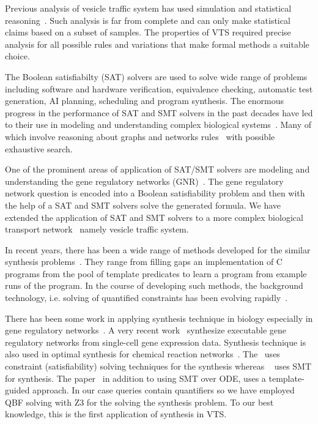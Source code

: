 Previous analysis of vesicle traffic system has used simulation and statistical reasoning~\cite{mani2016stacking}. 
%
Such analysis is far from complete and can only make statistical claims based on a subset of samples. 
%
The properties of VTS required precise analysis for all possible rules and variations that make formal methods a suitable choice.

The Boolean satisfiabilty (SAT) solvers are used to solve wide range of problems including
%
software and hardware verification, equivalence checking, automatic test generation,
AI planning, scheduling and program synthesis. 
%
The enormous progress in the performance of SAT and SMT solvers
in the past decades have led to their use in modeling and understanding complex biological systems~\cite{heule2010exact,yordanov2013smt,mangla2010timing}. 
%
Many of which involve reasoning about graphs and networks rules~\cite{guerra2012reasoning,chin2008biographe} with possible exhaustive search.
%

One of the prominent areas of application of SAT/SMT solvers are modeling and understanding the gene regulatory networks (GNR)~\cite{giacobbe2015model,rosenblueth2014inference, batt2010efficient, yordanov2016method, dunn2014defining, paoletti2014analyzing, koksal2013synthesis}.
%
The gene regulatory network question is encoded into a Boolean satisfiability problem and then with the help of a SAT and SMT solvers solve the generated formula. 
% 
We have extended the application of SAT and SMT solvers to a more complex biological transport network~\cite{mani2016stacking} namely vesicle traffic system. 

In recent years, there has been a wide range of methods
developed for the similar synthesis problems~\cite{sketch,sygus,exampleSynth}.
%
They range from filling gaps an implementation of C programs from the pool of template predicates to learn a program from example
runs of the program.
%
In the course of developing such methods,
the background technology, i.e. solving of quantified
constraints has been evolving rapidly~\cite{lonsing2010depqbf,z3Quant}.
%

There has been some work in
applying synthesis technique in biology especially in gene regulatory networks~\cite{shavit2016automated, fisher2015synthesising}. A very recent work~\cite{fisher2015synthesising} synthesize executable gene regulatory networks from single-cell gene expression data.
Synthesis technique is also used in optimal synthesis for chemical reaction networks~\cite{cardelli2017syntax}. The~\cite{fisher2015synthesising} uses constraint (satisfiability) solving techniques for the synthesis whereas ~\cite{shavit2016automated} uses SMT for synthesis. The paper~\cite{cardelli2017syntax} in addition to using SMT over ODE, uses a template-guided approach. In our case queries contain quantifiers so we have employed QBF solving with Z3 for the solving the synthesis problem. To our best knowledge, this is the first application of synthesis in VTS.

~        
